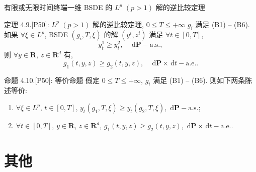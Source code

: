 \documentclass[xcolor=svgnames,serif,table,10pt]{beamer}
\newcommand{\rtn}{\mathrm{\mathbf{R}}}
\newcommand{\As}{\mathrm{a.s.}}
\newcommand{\Ae}{\mathrm{a.e.}}
\newcommand*{\PR}{\mathrm{\mathbf{P}}}
\newcommand*{\dif}{\,\mathrm{d}}
\newcommand*{\prs}{\dif\PR-\As}
\newcommand*{\pts}{\dif\PR\times\dif t-\Ae}
\newcommand{\tT}[1][0]{[#1,T]}
\begin{document}
\begin{frame}[t]{有限或无限时间终端一维 BSDE 的 $L^p$ $(p>1)$ 解的逆比较定理}
\vspace{-2ex}
  \begin{alertblock}{定理 4.9.[P50]: $L^p$ $(p>1)$ 解的逆比较定理, $0\leq T\leq+\infty$}
    \qquad $g_i$ 满足 (B1) -- (B6).
    如果 $\forall \xi\in L^p$,
    BSDE $(g_i,T,\xi)$ 的解 $(y^i_\cdot,z^i_\cdot)$ 满足
    $\forall t\in\tT$,
    \begin{equation*}
      y^1_t\geq y^2_t, \quad \prs,
    \end{equation*}
    则 $\forall y\in\rtn$, $z\in\rtn^d$ 有,
    \begin{equation*}
      g_1(t,y,z)\geq g_2(t,y,z),\quad\pts.
    \end{equation*}
  \end{alertblock}\pause

  \begin{alertblock}{命题 4.10.[P50]: 等价命题}
    \qquad 假定 $0\leq T\leq+\infty$, $g_i$ 满足 (B1) -- (B6).
    则如下两条陈述等价:
    \begin{enumerate}
      \item $\forall\xi\in L^p$, $t\in\tT$,
            $y_t(g_1,T,\xi)\geq y_t(g_2,T,\xi)$, $\prs$;
      \item $\forall t\in\tT$, $y\in\rtn$, $z\in\rtn^d$,
            $g_1(t,y,z)\geq g_2(t,y,z)$, $\pts$.
    \end{enumerate}
  \end{alertblock}
\end{frame}

\section{其他}

\end{document}
